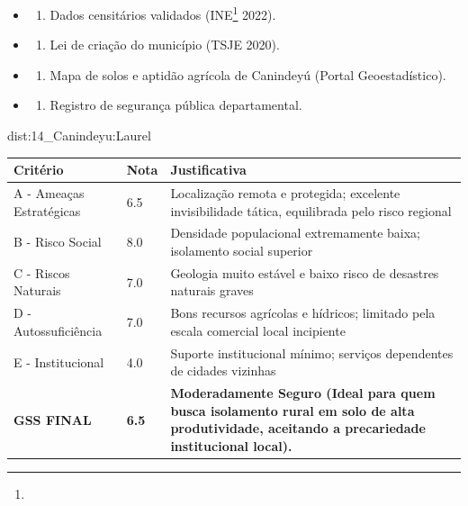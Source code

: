 {\begin{itemize}
\tightlist
\item
  \begin{enumerate}
  \def\labelenumi{\arabic{enumi})}
  \tightlist
  \item
    Dados censitários validados (INE\footnote{\fineINE} 2022).
  \end{enumerate}
\item
  \begin{enumerate}
  \def\labelenumi{\arabic{enumi})}
  \setcounter{enumi}{1}
  \tightlist
  \item
    Lei de criação do município (TSJE 2020).
  \end{enumerate}
\item
  \begin{enumerate}
  \def\labelenumi{\arabic{enumi})}
  \setcounter{enumi}{2}
  \tightlist
  \item
    Mapa de solos e aptidão agrícola de Canindeyú (Portal
    Geoestadístico).
  \end{enumerate}
\item
  \begin{enumerate}
  \def\labelenumi{\arabic{enumi})}
  \setcounter{enumi}{3}
  \tightlist
  \item
    Registro de segurança pública departamental.
  \end{enumerate}
\end{itemize}}{dist:14_Canindeyu:Laurel}
\begin{table}[ht!]
\small \begin{tabular}{p{3.0cm}p{0.8cm}p{6.0cm}} \toprule
\textbf{Critério} & \textbf{Nota} & \textbf{Justificativa} \\ \midrule
A - Ameaças Estratégicas & 6.5 & Localização remota e protegida; excelente invisibilidade tática, equilibrada pelo risco regional \\
B - Risco Social & 8.0 & Densidade populacional extremamente baixa; isolamento social superior \\
C - Riscos Naturais & 7.0 & Geologia muito estável e baixo risco de desastres naturais graves \\
D - Autossuficiência & 7.0 & Bons recursos agrícolas e hídricos; limitado pela escala comercial local incipiente \\
E - Institucional & 4.0 & Suporte institucional mínimo; serviços dependentes de cidades vizinhas \\
\midrule \textbf{GSS FINAL} & \textbf{6.5} & \textbf{Moderadamente Seguro (Ideal para quem busca isolamento rural em solo de alta produtividade, aceitando a precariedade institucional local).} \\ \bottomrule \end{tabular}
\end{table}
